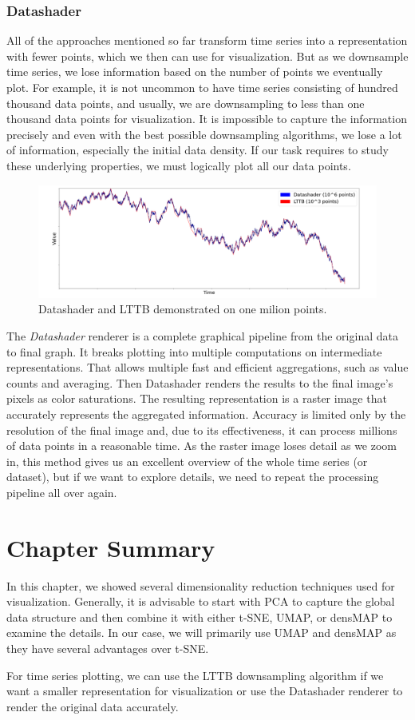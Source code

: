 \subsubsection{Datashader}
All of the approaches mentioned so far transform time series into a representation with fewer points, which we then can use for visualization. But as we downsample time series, we lose information based on the number of points we eventually plot. For example, it is not uncommon to have time series consisting of hundred thousand data points, and usually, we are downsampling to less than one thousand data points for visualization. It is impossible to capture the information precisely and even with the best possible downsampling algorithms, we lose a lot of information, especially the initial data density. If our task requires to study these underlying properties, we must logically plot all our data points.
\begin{figure}[tbh]
    \centering
     \includegraphics[width=\textwidth]{img/datashader.png}
    \caption{Datashader and LTTB demonstrated on one milion points.}
    \label{fig:my_label}
\end{figure}

The \textit{Datashader} renderer \cite{vis:datashader} is a complete graphical pipeline from the original data to final graph. It breaks plotting into multiple computations on intermediate representations.
That allows multiple fast and efficient aggregations, such as value counts and averaging. Then Datashader renders the results to the final image's pixels as color saturations. The resulting representation is a raster image that accurately represents the aggregated information. Accuracy is limited only by the resolution of the final image and, due to its effectiveness, it can process millions of data points in a reasonable time. As the raster image loses detail as we zoom in, this method gives us an excellent overview of the whole time series (or dataset), but if we want to explore details, we need to repeat the processing pipeline all over again.


\section{Chapter Summary}
In this chapter, we showed several dimensionality reduction techniques used for visualization. Generally, it is advisable to start with PCA to capture the global data structure and then combine it with either t-SNE, UMAP, or densMAP to examine the details. In our case, we will primarily use UMAP and densMAP as they have several advantages over t-SNE.

For time series plotting, we can use the LTTB downsampling algorithm if we want a smaller representation for visualization or use the Datashader renderer to render the original data accurately.
